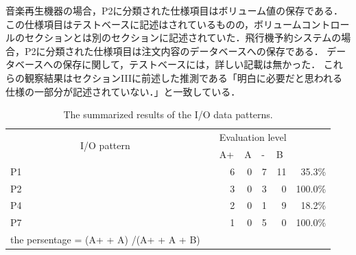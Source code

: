 \documentclass[a4paper,11pt]{jreport}
\begin{document}
 音楽再生機器の場合，P2に分類された仕様項目はボリューム値の保存である．この仕様項目はテストベースに記述はされているものの，ボリュームコントロールのセクションとは別のセクションに記述されていた．飛行機予約システムの場合，P2に分類された仕様項目は注文内容のデータベースへの保存である． データベースへの保存に関して，テストベースには，詳しい記載は無かった． これらの観察結果はセクションIIIに前述した推測である「明白に必要だと思われる仕様の一部分が記述されていない．」と一致している．


\begin{table}[htbp]
  \centering
  \caption{The summarized results of the I/O data patterns.}
    \begin{tabular}{lrrrrrr}
\cline{1-6}    \multicolumn{1}{|c}{\multirow{2}[4]{*}{I/O pattern }} & \multicolumn{1}{r|}{} & \multicolumn{4}{c|}{Evaluation level} &  \bigstrut\\
\cline{3-6}    \multicolumn{1}{|c}{} & \multicolumn{1}{r|}{} & \multicolumn{1}{l|}{A+} & \multicolumn{1}{l|}{A} & \multicolumn{1}{l|}{-} & \multicolumn{1}{l|}{B} &  \bigstrut\\
\cline{1-6}    \multicolumn{1}{|l|}{P1} & \multicolumn{1}{r|}{} & \multicolumn{1}{r|}{6} & \multicolumn{1}{r|}{0} & \multicolumn{1}{r|}{7} & \multicolumn{1}{r|}{11} & 35.3\% \bigstrut\\
\cline{1-6}    \multicolumn{1}{|l|}{P2} & \multicolumn{1}{r|}{} & \multicolumn{1}{r|}{3} & \multicolumn{1}{r|}{0} & \multicolumn{1}{r|}{3} & \multicolumn{1}{r|}{0} & 100.0\% \bigstrut\\
\cline{1-6}    \multicolumn{1}{|l|}{P4} & \multicolumn{1}{r|}{} & \multicolumn{1}{r|}{2} & \multicolumn{1}{r|}{0} & \multicolumn{1}{r|}{1} & \multicolumn{1}{r|}{9} & 18.2\% \bigstrut\\
\cline{1-6}    \multicolumn{1}{|l|}{P7} & \multicolumn{1}{r|}{} & \multicolumn{1}{r|}{1} & \multicolumn{1}{r|}{0} & \multicolumn{1}{r|}{5} & \multicolumn{1}{r|}{0} & 100.0\% \bigstrut\\
\cline{1-6}    the persentage = (A+  +  A) /(A+  +  A + B)  &       &       &       &       &       &  \bigstrut[t]\\
    \end{tabular}%
  \label{tbl:D-3-tbl9}%
\end{table}%
\end{document}
